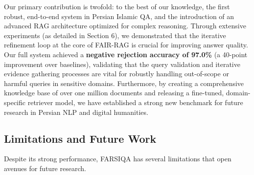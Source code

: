 \documentclass[11pt]{article}
\begin{document}
Our primary contribution is twofold: to the best of our knowledge, the first robust, end-to-end system in Persian Islamic QA, and the introduction of an advanced RAG architecture optimized for complex reasoning. Through extensive experiments (as detailed in Section 6), we demonstrated that the iterative refinement loop at the core of FAIR-RAG is crucial for improving answer quality. Our full system achieved a \textbf{negative rejection accuracy of 97.0\%} (a 40-point improvement over baselines), validating that the query validation and iterative evidence gathering processes are vital for robustly handling out-of-scope or harmful queries in sensitive domains. Furthermore, by creating a comprehensive knowledge base of over one million documents and releasing a fine-tuned, domain-specific retriever model, we have established a strong new benchmark for future research in Persian NLP and digital humanities.

\subsection{Limitations and Future Work}

Despite its strong performance, FARSIQA has several limitations that open avenues for future research.
\end{document}
